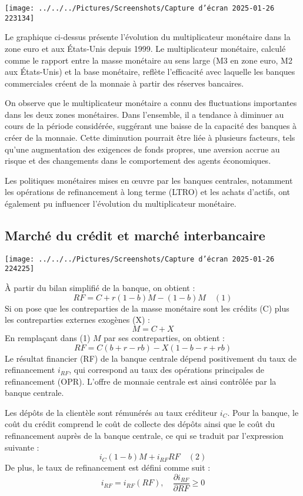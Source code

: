 \documentclass[a4paper, 12pt]{report}
\begin{document}
\begin{center}
	\texttt{[image: ../../../Pictures/Screenshots/Capture d'écran 2025-01-26 223134]}
\end{center}
	
Le graphique ci-dessus présente l'évolution du multiplicateur monétaire dans la zone euro et aux États-Unis depuis 1999. Le multiplicateur monétaire, calculé comme le rapport entre la masse monétaire au sens large (M3 en zone euro, M2 aux États-Unis) et la base monétaire, reflète l'efficacité avec laquelle les banques commerciales créent de la monnaie à partir des réserves bancaires.

On observe que le multiplicateur monétaire a connu des fluctuations importantes dans les deux zones monétaires. Dans l'ensemble, il a tendance à diminuer au cours de la période considérée, suggérant une baisse de la capacité des banques à créer de la monnaie. Cette diminution pourrait être liée à plusieurs facteurs, tels qu'une augmentation des exigences de fonds propres, une aversion accrue au risque et des changements dans le comportement des agents économiques.

Les politiques monétaires mises en œuvre par les banques centrales, notamment les opérations de refinancement à long terme (LTRO) et les achats d'actifs, ont également pu influencer l'évolution du multiplicateur monétaire.	
	
\subsection{Marché du crédit et marché interbancaire}
	
\begin{center}
	\texttt{[image: ../../../Pictures/Screenshots/Capture d'écran 2025-01-26 224225]}
\end{center}
	
À partir du bilan simplifié de la banque, on obtient :  
\[
RF = C + r(1-b) M - (1-b) M \quad (1)
\]
Si on pose que les contreparties de la masse monétaire sont les crédits (C) plus les contreparties externes exogènes (X) :  
\[
M = C + X
\]
En remplaçant dans (1) \( M \) par ses contreparties, on obtient :  
\[
RF = C (b+r-rb) - X (1-b-r+rb)
\]
Le résultat financier (RF) de la banque centrale dépend positivement du taux de refinancement \( i_{RF} \), qui correspond au taux des opérations principales de refinancement (OPR). L'offre de monnaie centrale est ainsi contrôlée par la banque centrale.  

Les dépôts de la clientèle sont rémunérés au taux créditeur \( i_C \). Pour la banque, le coût du crédit comprend le coût de collecte des dépôts ainsi que le coût du refinancement auprès de la banque centrale, ce qui se traduit par l'expression suivante :  
\[
i_C (1-b) M + i_{RF} RF \quad (2)
\]
De plus, le taux de refinancement est défini comme suit :  
\[
i_{RF} = i_{RF}(RF), \quad \frac{\partial i_{RF}}{\partial RF} \geq 0
\]
\end{document}
